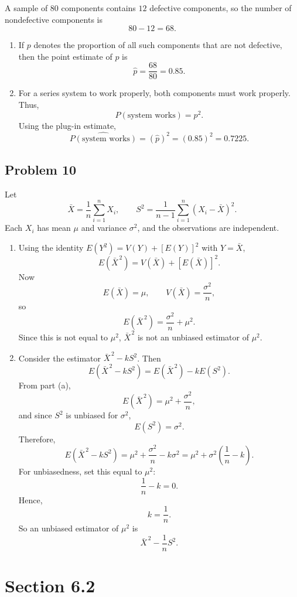 \documentclass[11pt]{article}
\begin{document}
A sample of $80$ components contains $12$ defective components, so the number of nondefective components is
\[
80-12=68.
\]

\begin{enumerate}
\item[(a)] If $p$ denotes the proportion of all such components that are not defective, then the point estimate of $p$ is
\[
\hat{p}=\frac{68}{80}=0.85.
\]

\item[(b)] For a series system to work properly, both components must work properly. Thus,
\[
P(\text{system works})=p^2.
\]
Using the plug-in estimate,
\[
\widehat{P(\text{system works})}=(\hat{p})^2=(0.85)^2=0.7225.
\]
\end{enumerate}

\subsection*{Problem 10}

Let
\[
\bar{X}=\frac{1}{n}\sum_{i=1}^{n}X_i, \qquad S^2=\frac{1}{n-1}\sum_{i=1}^{n}(X_i-\bar{X})^2.
\]
Each $X_i$ has mean $\mu$ and variance $\sigma^2$, and the observations are independent.

\begin{enumerate}
\item[(a)] Using the identity $E(Y^2)=V(Y)+[E(Y)]^2$ with $Y=\bar{X}$,
\[
E(\bar{X}^{\,2})=V(\bar{X})+[E(\bar{X})]^2.
\]
Now
\[
E(\bar{X})=\mu, \qquad V(\bar{X})=\frac{\sigma^2}{n},
\]
so
\[
E(\bar{X}^{\,2})=\frac{\sigma^2}{n}+\mu^2.
\]
Since this is not equal to $\mu^2$, $\bar{X}^{\,2}$ is not an unbiased estimator of $\mu^2$.

\item[(b)] Consider the estimator $\bar{X}^{\,2}-kS^2$. Then
\[
E(\bar{X}^{\,2}-kS^2)=E(\bar{X}^{\,2})-kE(S^2).
\]
From part (a),
\[
E(\bar{X}^{\,2})=\mu^2+\frac{\sigma^2}{n},
\]
and since $S^2$ is unbiased for $\sigma^2$,
\[
E(S^2)=\sigma^2.
\]
Therefore,
\[
E(\bar{X}^{\,2}-kS^2)=\mu^2+\frac{\sigma^2}{n}-k\sigma^2
=\mu^2+\sigma^2\left(\frac{1}{n}-k\right).
\]
For unbiasedness, set this equal to $\mu^2$:
\[
\frac{1}{n}-k=0.
\]
Hence,
\[
k=\frac{1}{n}.
\]
So an unbiased estimator of $\mu^2$ is
\[
\bar{X}^{\,2}-\frac{1}{n}S^2.
\]
\end{enumerate}

\section*{Section 6.2}
\end{document}
